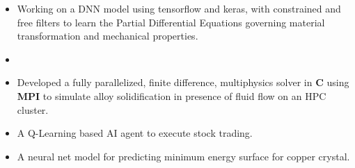 \documentclass[10pt,a4paper]{altacv}
\begin{document}
\begin{itemize}
\item Working on a DNN model using tensorflow and keras, with constrained and
free filters to learn the Partial Differential Equations governing material
transformation and mechanical properties.
\end{itemize}
\divider

\begin{itemize}
\item {}
\item Developed a fully parallelized, finite difference, multiphysics solver
in \textbf{C} using \textbf{MPI} to simulate alloy solidification in presence
of fluid flow on an HPC cluster.
\end{itemize}
\divider

\begin{itemize}
\item A Q-Learning based AI agent to execute stock trading.
\item A neural net model for predicting minimum energy surface for copper crystal.
\end{itemize}

%

%

\clearpage
\end{document}
